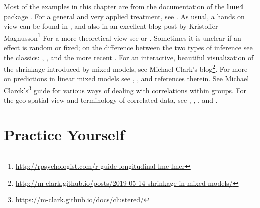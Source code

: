 \documentclass[]{book}
\renewcommand{\href}[2]{#2\footnote{\url{#1}}}
\theoremstyle{definition}
\theoremstyle{definition}
\theoremstyle{definition}
\theoremstyle{remark}
\begin{document}
Most of the examples in this chapter are from the documentation of the \textbf{lme4} package \citep{lme4}.
For a general and very applied treatment, see \citet{pinero2000mixed}.
As usual, a hands on view can be found in \citet{venables2013modern}, and also in an excellent blog post by \href{http://rpsychologist.com/r-guide-longitudinal-lme-lmer}{Kristoffer Magnusson}
For a more theoretical view see \citet{weiss2005modeling} or \citet{searle2009variance}.
Sometimes it is unclear if an effect is random or fixed; on the difference between the two types of inference see the classics: \citet{eisenhart1947assumptions}, \citet{kempthorne1975fixed}, and the more recent \citet{rosset2018fixed}.
For an interactive, beautiful visualization of the shrinkage introduced by mixed models, see \href{http://m-clark.github.io/posts/2019-05-14-shrinkage-in-mixed-models/}{Michael Clark's blog}.
For more on predictions in linear mixed models see \citet{robinson1991blup}, \citet{rabinowicz2018assessing}, and references therein.
See \href{https://m-clark.github.io/docs/clustered/}{Michael Clarck's} guide for various ways of dealing with correlations within groups.
For the geo-spatial view and terminology of correlated data, see \citet{christakos2000modern}, \citet{diggle1998model}, \citet{allard2013j}, and \citet{cressie2015statistics}.

\hypertarget{practice-yourself-4}{%
\section{Practice Yourself}\label{practice-yourself-4}}
\end{document}
